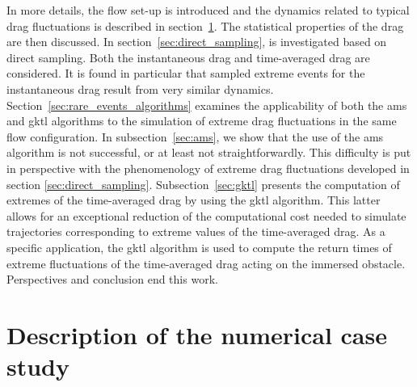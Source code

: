 \documentclass{jfm}
\newcommand{\EL}[1]{{\color{myred}{#1}}}
\begin{document}
In more details,  the flow set-up is introduced and the dynamics related to typical
drag fluctuations is described in section~\ref{sec:test_flow}.
The statistical properties of the drag are then discussed.
In section~\ref{sec:direct_sampling}, \EL{the phenomenology of  extreme drag fluctuations} is investigated based on direct sampling.
Both the instantaneous drag and time-averaged drag are considered.
It is found in particular that sampled extreme events for the instantaneous drag result from very similar dynamics. %
Section~\ref{sec:rare_events_algorithms} examines the applicability of both the \ac{ams} and \ac{gktl} algorithms to the simulation of extreme drag fluctuations in the same flow configuration.
In subsection~\ref{sec:ams}, we show that the use of the \ac{ams} algorithm is not successful, or at least not straightforwardly. This difficulty is put in perspective with the phenomenology of extreme drag fluctuations developed in  section \ref{sec:direct_sampling}.
Subsection~\ref{sec:gktl} presents the computation of extremes of the time-averaged drag by using the \ac{gktl} algorithm.
This latter allows for an exceptional reduction of the computational cost needed to simulate trajectories corresponding to extreme values of the time-averaged drag.
As a specific \EL{successful} application, the \ac{gktl} algorithm is used to compute the return times of extreme fluctuations of the time-averaged drag acting on the immersed obstacle.
Perspectives and conclusion end this work.

\section{Description of the numerical case study}
\label{sec:test_flow}
\end{document}
